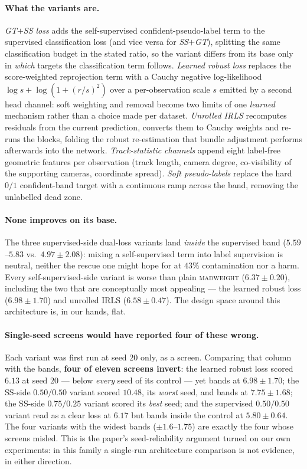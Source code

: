 \documentclass[10pt,twocolumn,letterpaper]{article}
\newcommand{\mad}{\textsc{madweight}}
\begin{document}
\paragraph{What the variants are.} \emph{GT$+$SS loss} adds the self-supervised
confident-pseudo-label term to the supervised classification loss (and vice versa for
\emph{SS$+$GT}), splitting the same classification budget in the stated ratio, so the
variant differs from its base only in \emph{which} targets the classification term
follows. \emph{Learned robust loss} replaces the score-weighted reprojection term with a
Cauchy negative log-likelihood $\log s + \log(1+(r/s)^2)$ over a per-observation scale
$s$ emitted by a second head channel: soft weighting and removal become two limits of
one \emph{learned} mechanism rather than a choice made per dataset. \emph{Unrolled IRLS}
recomputes residuals from the current prediction, converts them to Cauchy weights and
re-runs the blocks, folding the robust re-estimation that bundle adjustment performs
afterwards into the network. \emph{Track-statistic channels} append eight label-free
geometric features per observation (track length, camera degree, co-visibility of the
supporting cameras, coordinate spread). \emph{Soft pseudo-labels} replace the hard
$0/1$ confident-band target with a continuous ramp across the band, removing the
unlabelled dead zone.

\paragraph{None improves on its base.} The three supervised-side dual-loss variants land
\emph{inside} the supervised band ($5.59$--$5.83$ vs.\ $4.97\pm2.08$): mixing a
self-supervised term into label supervision is neutral, neither the rescue one might
hope for at $43\%$ contamination nor a harm. Every self-supervised-side variant is worse
than plain \mad{} ($6.37\pm0.20$), including the two that are conceptually most
appealing --- the learned robust loss ($6.98\pm1.70$) and unrolled IRLS
($6.58\pm0.47$). The design space around this architecture is, in our hands, flat.

\paragraph{Single-seed screens would have reported four of these wrong.} Each variant
was first run at seed $20$ only, as a screen. Comparing that column with the bands,
\textbf{four of eleven screens invert}: the learned robust loss scored $6.13$ at seed
$20$ --- below \emph{every} seed of its control --- yet bands at $6.98\pm1.70$; the
SS-side $0.50/0.50$ variant scored $10.48$, its \emph{worst} seed, and bands at
$7.75\pm1.68$; the SS-side $0.75/0.25$ variant scored its \emph{best} seed; and the
supervised $0.50/0.50$ variant read as a clear loss at $6.17$ but bands inside the
control at $5.80\pm0.64$. The four variants with the widest bands ($\pm1.6$--$1.75$) are
exactly the four whose screens misled. This is the paper's seed-reliability argument
turned on our own experiments: in this family a single-run architecture comparison is
not evidence, in either direction.
\end{document}
